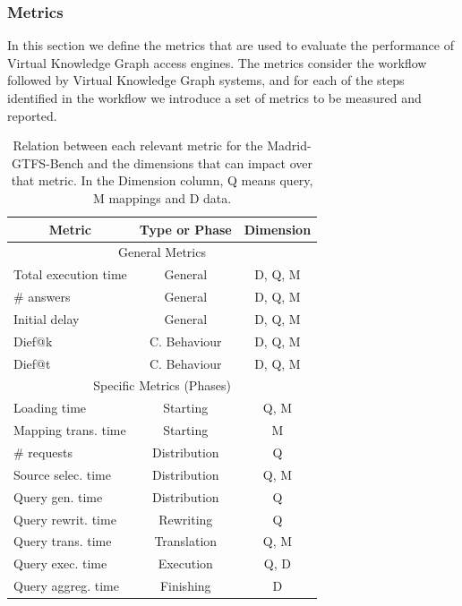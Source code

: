 \subsubsection{Metrics}
In this section we define the metrics that are used to evaluate the performance of Virtual Knowledge Graph access engines. The metrics consider the workflow followed by Virtual Knowledge Graph systems, and for each of the steps identified in the workflow we introduce a set of metrics to be measured and reported.
\begin{table}[]
\caption[Metrics VS dimensions]{Relation between each relevant metric for the Madrid-GTFS-Bench and the dimensions that can impact over that metric. In the Dimension column, Q means query, M mappings and D data.}
\label{tab:dimsensions}
\begin{tabular}{l|c|c}
\hline
\multicolumn{1}{c|}{\textbf{Metric}} & \textbf{Type or Phase} & \textbf{Dimension}  \\ \hline
\multicolumn{3}{c}{General Metrics}                                                 \\ \hline
Total execution time                & General                & D, Q, M \\ \hline
\# answers                            & General                & D, Q, M \\ \hline
Initial delay                         & General                & D, Q, M \\ \hline
Dief@k                                & C. Behaviour           & D, Q, M \\ \hline
Dief@t                                & C. Behaviour           & D, Q, M \\ \hline
\multicolumn{3}{c}{Specific Metrics (Phases)}                                       \\ \hline
Loading time                          & Starting        & Q, M      \\ \hline
Mapping trans. time              & Starting         & M              \\ \hline
\# requests                           & Distribution      & Q              \\ \hline
Source selec. time                 & Distribution      & Q, M     \\ \hline
Query gen. time                 & Distribution      & Q               \\ \hline
Query rewrit. time                  & Rewriting     & Q                \\ \hline
Query trans. time                & Translation    & Q, M       \\ \hline
Query exec. time                  & Execution     & Q, D          \\ \hline
Query aggreg. time                & Finishing         & D                 \\ \hline
\end{tabular}
\end{table}

